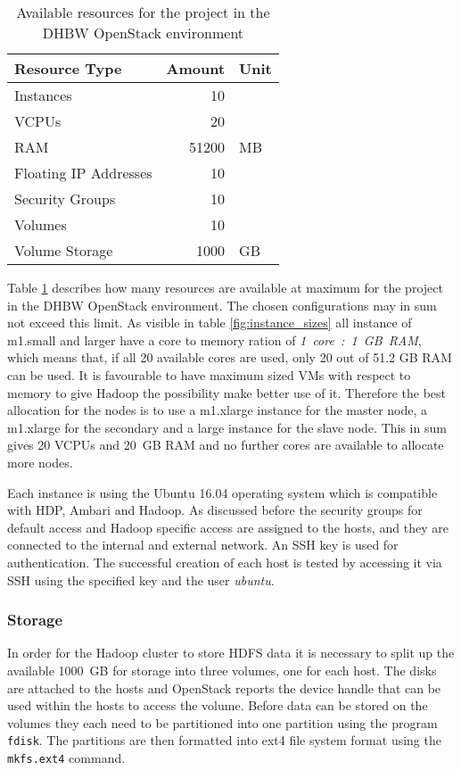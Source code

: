 \begin{table}[hbt]
\centering
	\begin{tabular}{lrl}
	  Resource Type & Amount & Unit\\
	  \hline
	  Instances & 10 & \\
	  \acp{VCPU} & 20 & \\
	  \acs{RAM} & 51200 & \acs{MB} \\
	  Floating \acs{IP} Addresses & 10 & \\
	  Security Groups & 10 & \\
	  Volumes & 10 & \\
	  Volume Storage & 1000 & \acs{GB}
	\end{tabular}
	\caption{Available resources for the project in the \ac{DHBW} OpenStack environment}
	\label{fig:resources_openstack}
\end{table}

Table \ref{fig:resources_openstack} describes how many resources are available at maximum for the project in the \ac{DHBW} OpenStack environment. The chosen configurations may in sum not exceed this limit.
As visible in table \ref{fig:instance_sizes} all instance of m1.small and larger have a core to memory ration of \emph{1~core~:~1~GB~RAM}, which means that, if all 20 available cores are used, only 20 out of 51.2 GB RAM  can be used. It is favourable to have maximum sized \acp{VM} with respect to memory to give Hadoop the possibility make better use of it.
Therefore the best allocation for the nodes is to use a m1.xlarge instance for the master node, a m1.xlarge for the secondary and a large instance for the slave node.
This in sum gives 20 \acp{VCPU} and 20~\ac{GB} \ac{RAM} and no further cores are available to allocate more nodes.


Each instance is using the Ubuntu 16.04 operating system which is compatible with \ac{HDP}, Ambari and Hadoop. As discussed before the security groups for default access and Hadoop specific access are assigned to the hosts, and they are connected to the internal and external network. An \ac{SSH} key is used for authentication.
The successful creation of each host is tested by accessing it via \ac{SSH} using the specified key and the user \emph{ubuntu}.


\subsubsection{Storage}

In order for the Hadoop cluster to store \ac{HDFS} data it is necessary to split up the available 1000~\ac{GB} for storage into three volumes, one for each host.
The disks are attached to the hosts and OpenStack reports the device handle that can be 
used within the hosts to access the volume.
Before data can be stored on the volumes they each need to be partitioned into one partition using the program \texttt{fdisk}. The partitions are then formatted into ext4 file system format using the \texttt{mkfs.ext4} command.

